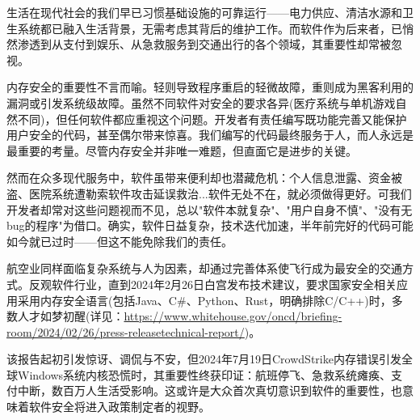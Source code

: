 生活在现代社会的我们早已习惯基础设施的可靠运行——电力供应、清洁水源和卫生系统都已融入生活背景，无需考虑其背后的维护工作。而软件作为后来者，已悄然渗透到从支付到娱乐、从急救服务到交通出行的各个领域，其重要性却常被忽视。

内存安全的重要性不言而喻。轻则导致程序重启的轻微故障，重则成为黑客利用的漏洞或引发系统级故障。虽然不同软件对安全的要求各异(医疗系统与单机游戏自然不同)，但任何软件都应重视这个问题。开发者有责任编写既功能完善又能保护用户安全的代码，甚至偶尔带来惊喜。我们编写的代码最终服务于人，而人永远是最重要的考量。尽管内存安全并非唯一难题，但直面它是进步的关键。

然而在众多现代服务中，软件虽带来便利却也潜藏危机：个人信息泄露、资金被盗、医院系统遭勒索软件攻击延误救治...软件无处不在，就必须做得更好。可我们开发者却常对这些问题视而不见，总以"软件本就复杂"、"用户自身不慎"、"没有无bug的程序"为借口。确实，软件日益复杂，技术迭代加速，半年前完好的代码可能如今就已过时——但这不能免除我们的责任。

航空业同样面临复杂系统与人为因素，却通过完善体系使飞行成为最安全的交通方式。反观软件行业，直到2024年2月26日白宫发布技术建议，要求国家安全相关应用采用内存安全语言(包括Java、C\#、Python、Rust，明确排除C/C++)时，多数人才如梦初醒(详见：\url{https://www.whitehouse.gov/oncd/briefing-room/2024/02/26/press-releasetechnical-report/})。

该报告起初引发惊讶、调侃与不安，但2024年7月19日CrowdStrike内存错误引发全球Windows系统内核恐慌时，其重要性终获印证：航班停飞、急救系统瘫痪、支付中断，数百万人生活受影响。这或许是大众首次真切意识到软件的重要性，也意味着软件安全将进入政策制定者的视野。
